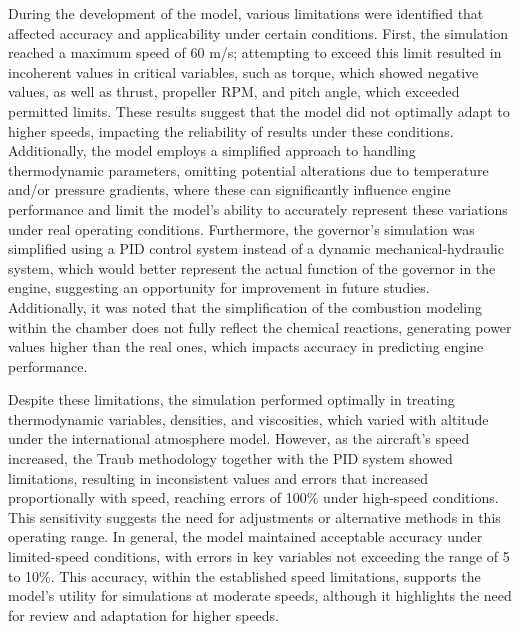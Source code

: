\documentclass{Format}
\begin{document}
During the development of the model, various limitations were identified that affected accuracy and applicability under certain conditions. First, the simulation reached a maximum speed of 60 m/s; attempting to exceed this limit resulted in incoherent values in critical variables, such as torque, which showed negative values, as well as thrust, propeller RPM, and pitch angle, which exceeded permitted limits. These results suggest that the model did not optimally adapt to higher speeds, impacting the reliability of results under these conditions. Additionally, the model employs a simplified approach to handling thermodynamic parameters, omitting potential alterations due to temperature and/or pressure gradients, where these can significantly influence engine performance and limit the model’s ability to accurately represent these variations under real operating conditions. Furthermore, the governor’s simulation was simplified using a PID control system instead of a dynamic mechanical-hydraulic system, which would better represent the actual function of the governor in the engine, suggesting an opportunity for improvement in future studies. Additionally, it was noted that the simplification of the combustion modeling within the chamber does not fully reflect the chemical reactions, generating power values higher than the real ones, which impacts accuracy in predicting engine performance.

Despite these limitations, the simulation performed optimally in treating thermodynamic variables, densities, and viscosities, which varied with altitude under the international atmosphere model. However, as the aircraft’s speed increased, the Traub methodology together with the PID system showed limitations, resulting in inconsistent values and errors that increased proportionally with speed, reaching errors of 100\% under high-speed conditions. This sensitivity suggests the need for adjustments or alternative methods in this operating range. In general, the model maintained acceptable accuracy under limited-speed conditions, with errors in key variables not exceeding the range of 5 to 10\%. This accuracy, within the established speed limitations, supports the model’s utility for simulations at moderate speeds, although it highlights the need for review and adaptation for higher speeds.
\end{document}
